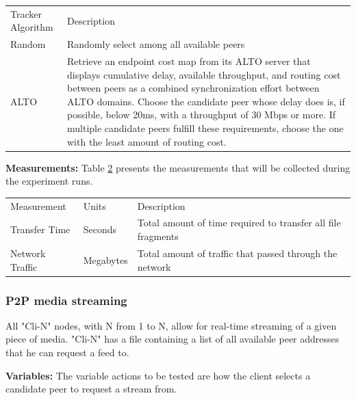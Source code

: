 \begin{table}[]
\begin{tabular}{ll}
Tracker Algorithm & Description                                                                                                                                                                                                \\
Random            & Randomly select among all available peers                                                                                                                                                                  \\
ALTO              & Retrieve an endpoint cost map from its ALTO server that displays cumulative delay, available throughput, and routing cost between peers as a combined synchronization effort between ALTO domains.
Choose the candidate peer whose delay does is, if possible, below 20ms, with a throughput of 30 Mbps or more.
If multiple candidate peers fulfill these requirements, choose the one with the least amount of routing cost.
\end{tabular}
\label{table:s1-tracker-methods}
\end{table}

\textbf{Measurements:} Table \ref{table:s1-measurements} presents the measurements that will be collected during the experiment runs.

\begin{table}[]
\begin{tabular}{lll}
Measurement     & Units     & Description                                                  \\
Transfer Time   & Seconds   & Total amount of time required to transfer all file fragments \\
Network Traffic & Megabytes & Total amount of traffic that passed through the network
\end{tabular}
\label{table:s1-measurements}
\end{table}

\subsubsection{P2P media streaming}

 All "Cli-N" nodes, with N from 1 to N, allow for real-time streaming of a given piece of media.
"Cli-N" has a file containing a list of all available peer addresses that he can request a feed to.

\textbf{Variables: } The variable actions to be tested are how the client selects a candidate peer to request a stream from.

